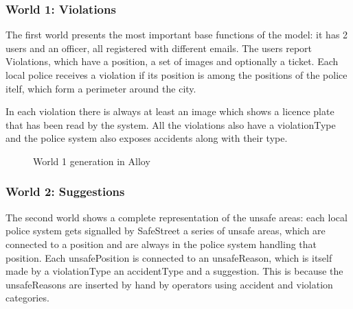 \subsubsection{World 1: Violations}
The first world presents the most important base functions of the model: it has 2 users and an
officer, all registered with different emails. The users report Violations, which have a position, a set of images
and optionally a ticket. Each local police receives a violation if its position is among the positions of the police itelf,
which form a perimeter around the city.

In each violation there is always at least an image which shows a licence plate that has been read
by the system. All the violations also have a violationType and the police system also exposes accidents along with their type.

\clearpage
\begin{figure}
    \noindent{}
    \caption{World 1 generation in Alloy}
\end{figure}
\clearpage

\subsubsection{World 2: Suggestions}
The second world shows a complete representation of the unsafe areas: each local police system gets signalled by SafeStreet
a series of unsafe areas, which are connected to a position and are always in the police system handling that position.
Each unsafePosition is connected to an unsafeReason, which is itself made by a violationType an accidentType and a suggestion. This is
because the unsafeReasons are inserted by hand by operators using accident and violation categories.

